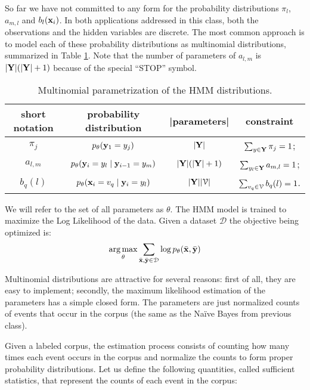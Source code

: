 So far we have not committed to any form for the probability
distributions $\pi_l$, $a_{m,l}$ and $b_l(\mathbf{x}_i)$. In both applications
addressed in this class, both the observations and the hidden
variables are discrete. The most common approach is to model each of
these probability distributions as multinomial distributions,
summarized in Table \ref{tt:mult-params}. Note that the number of parameters of $a_{l,m}$ is $|\mathbf{Y}|(|\mathbf{Y}|+1)$ because of the special ``STOP'' symbol.

\begin{table}
\begin{center}
\begin{tabular}{|c|c|c|c|}
\hline
short notation & probability distribution  & |parameters|& constraint \\
\hline
$\pi_j$ & $p_{\theta} (\mathbf{y}_1 = {y}_j)$ & $|\mathbf{Y}|$ & $\sum_{{y} \in \mathbf{Y}} \pi_j = 1$;\\
\hline
$a_{l,m}$ & $p_{\theta} (\mathbf{y}_i = {y}_l \mid \mathbf{y}_{i-1} = {y}_m)$ & $|\mathbf{Y}|(|\mathbf{Y}|+1)$ &$\sum_{{y}_l \in \mathbf{Y}} a_{m,l} = 1$;\\
\hline
$b_q(l) $& $p_{\theta}(\mathbf{x}_i = {v}_q\mid \mathbf{y}_i = {y}_l)$  & $|\mathbf{Y}||\mathcal{V}|$ &$\sum_{{v}_q \in \mathcal{V}} b_q(l)  = 1$.\\
\hline
\end{tabular}
\end{center}
\caption[HMM multinomial parametrization]{\label{tt:mult-params}Multinomial parametrization of the HMM distributions.}
\end{table}

We will refer to the set of all parameters as $\theta$. The HMM model
is trained to maximize the Log Likelihood of the data. Given a
dataset $\mathcal{D}$ the objective being optimized is:
\begin{equation}
\operatorname*{arg\,max}_{\theta} \sum_{\bar{\mathbf{x}},\bar{\mathbf{y}} \in \mathcal{D}} \log p_{\theta}(\bar{\mathbf{x}} ,\bar{\mathbf{y}})
\end{equation}


Multinomial distributions are attractive for several reasons: first of
all, they are easy to implement; secondly, the maximum likelihood estimation of the parameters has a simple closed form. The parameters are just
normalized counts of events that occur in the corpus (the same as the
Na\"{i}ve Bayes from previous class).

Given a labeled corpus, the estimation process consists of counting how
many times each event occurs in the corpus and normalize the counts to
form proper probability distributions. Let us define the following
quantities, called sufficient statistics, that represent the counts of
each event in the corpus:

